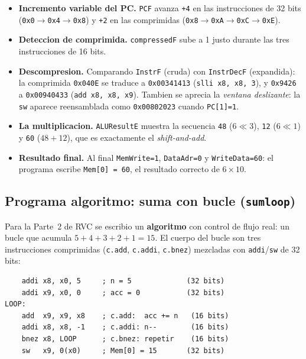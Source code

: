\documentclass[11pt,a4paper]{article}
\begin{document}
\begin{itemize}[leftmargin=1.6em]
  \item \textbf{Incremento variable del PC.} \texttt{PCF} avanza \texttt{+4} en las
        instrucciones de 32 bits (\texttt{0x0}$\to$\texttt{0x4}$\to$\texttt{0x8})
        y \texttt{+2} en las comprimidas
        (\texttt{0x8}$\to$\texttt{0xA}$\to$\texttt{0xC}$\to$\texttt{0xE}).
  \item \textbf{Deteccion de comprimida.} \texttt{compressedF} sube a 1 justo
        durante las tres instrucciones de 16 bits.
  \item \textbf{Descompresion.} Comparando \texttt{InstrF} (cruda) con
        \texttt{InstrDecF} (expandida): la comprimida \texttt{0x040E} se traduce a
        \texttt{0x00341413} (\texttt{slli x8, x8, 3}), y \texttt{0x9426} a
        \texttt{0x00940433} (\texttt{add x8, x8, x9}). Tambien se aprecia la
        \emph{ventana deslizante}: la \texttt{sw} aparece reensamblada como
        \texttt{0x00802023} cuando \texttt{PC[1]=1}.
  \item \textbf{La multiplicacion.} \texttt{ALUResultE} muestra la secuencia
        \texttt{48} ($6\ll3$), \texttt{12} ($6\ll1$) y \texttt{60} ($48+12$), que
        es exactamente el \emph{shift-and-add}.
  \item \textbf{Resultado final.} Al final \texttt{MemWrite=1}, \texttt{DataAdr=0}
        y \texttt{WriteData=60}: el programa escribe \texttt{Mem[0] = 60}, el
        resultado correcto de $6\times10$.
\end{itemize}

\subsection{Programa algoritmo: suma con bucle (\texttt{sumloop})}

Para la Parte~2 de RVC se escribio un \textbf{algoritmo} con control de flujo
real: un bucle que acumula $5+4+3+2+1 = 15$. El cuerpo del bucle son tres
instrucciones comprimidas (\texttt{c.add}, \texttt{c.addi}, \texttt{c.bnez})
mezcladas con \texttt{addi}/\texttt{sw} de 32 bits:

\begin{lstlisting}
    addi x8, x0, 5     ; n = 5             (32 bits)
    addi x9, x0, 0     ; acc = 0           (32 bits)
LOOP:
    add  x9, x9, x8    ; c.add:  acc += n   (16 bits)
    addi x8, x8, -1    ; c.addi: n--        (16 bits)
    bnez x8, LOOP      ; c.bnez: repetir    (16 bits)
    sw   x9, 0(x0)     ; Mem[0] = 15       (32 bits)
\end{lstlisting}
\end{document}
